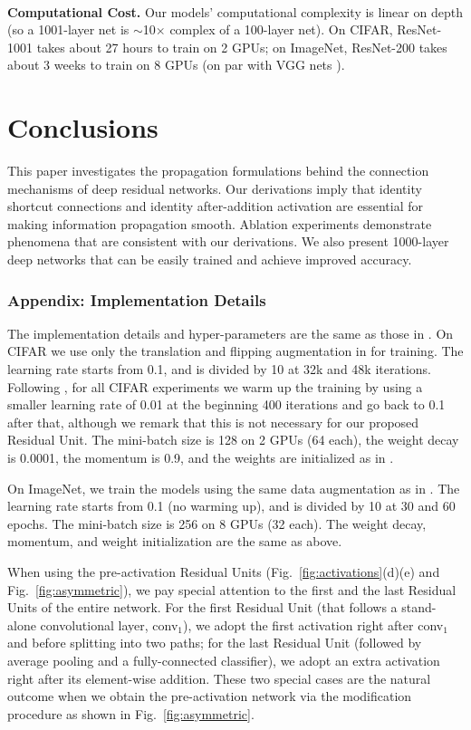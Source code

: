 \documentclass[runningheads]{llncs}
\begin{document}
{\small ~\\}
\noindent\textbf{Computational Cost.}
Our models' computational complexity is linear on depth (so a 1001-layer net is $\sim$10$\times$ complex of a 100-layer net). On CIFAR, ResNet-1001 takes about 27 hours to train on 2 GPUs; on ImageNet, ResNet-200 takes about 3 weeks to train on 8 GPUs (on par with VGG nets \cite{Simonyan2015}).


\section{Conclusions}

This paper investigates the propagation formulations behind the connection mechanisms of deep residual networks. Our derivations imply that identity shortcut connections and identity after-addition activation are essential for making information propagation smooth. Ablation experiments demonstrate phenomena that are consistent with our derivations. We also present 1000-layer deep networks that can be easily trained and achieve improved accuracy.

\subsubsection*{Appendix: Implementation Details}

The implementation details and hyper-parameters are the same as those in \cite{He2016}. On CIFAR we use only the translation and flipping augmentation in \cite{He2016} for training. The learning rate starts from 0.1, and is divided by 10 at 32k and 48k iterations. Following \cite{He2016}, for all CIFAR experiments we warm up the training by using a smaller learning rate of 0.01 at the beginning 400 iterations and go back to 0.1 after that, although we remark that this is not necessary for our proposed Residual Unit. The mini-batch size is 128 on 2 GPUs (64 each), the weight decay is 0.0001, the momentum is 0.9, and the weights are initialized as in \cite{He2015}.

On ImageNet, we train the models using the same data augmentation as in \cite{He2016}. The learning rate starts from 0.1 (no warming up), and is divided by 10 at 30 and 60 epochs. The mini-batch size is 256 on 8 GPUs (32 each). The weight decay, momentum, and weight initialization are the same as above.

When using the pre-activation Residual Units (Fig.~\ref{fig:activations}(d)(e) and Fig.~\ref{fig:asymmetric}), we pay special attention to the first and the last Residual Units of the entire network. For the first Residual Unit (that follows a stand-alone convolutional layer, conv$_1$), we adopt the first activation right after conv$_1$ and before splitting into two paths; for the last Residual Unit (followed by average pooling and a fully-connected classifier), we adopt an extra activation right after its element-wise addition.
These two special cases are the natural outcome when we obtain the pre-activation network via the modification procedure as shown in Fig.~\ref{fig:asymmetric}.
\end{document}
